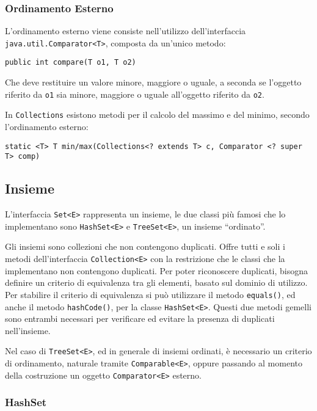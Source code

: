 \documentclass{article}
\numberwithin{equation}{subsection}
\begin{document}
\subsubsection{Ordinamento Esterno}

L'ordinamento esterno viene consiste nell'utilizzo dell'interfaccia \verb|java.util.Comparator<T>|, composta da un'unico metodo:
\begin{verbatim}
public int compare(T o1, T o2)
\end{verbatim}
Che deve restituire un valore minore, maggiore o uguale, a seconda se l'oggetto riferito da \verb|o1| sia minore, maggiore o uguale all'oggetto riferito da \verb|o2|. 

In \verb|Collections| esistono metodi per il calcolo del massimo e del minimo, secondo l'ordinamento esterno:
\begin{verbatim}
static <T> T min/max(Collections<? extends T> c, Comparator <? super T> comp)
\end{verbatim}

\subsection{Insieme}


L'interfaccia \verb|Set<E>| rappresenta un insieme, le due classi più famosi che lo implementano sono \verb|HashSet<E>| e \verb|TreeSet<E>|, un insieme ``ordinato''. 

Gli insiemi sono collezioni che non contengono duplicati. Offre tutti e soli i metodi dell'interfaccia \verb|Collection<E>| con la restrizione che le classi che la 
implementano non contengono duplicati. 
Per poter riconoscere duplicati, bisogna definire un criterio di equivalenza tra gli elementi, basato sul dominio di utilizzo. 
Per stabilire il criterio di equivalenza si può utilizzare il metodo \verb|equals()|, ed anche il metodo \verb|hashCode()|, per la classe \verb|HashSet<E>|. 
Questi due metodi gemelli sono entrambi necessari per verificare ed evitare la presenza di duplicati nell'insieme. 

Nel caso di \verb|TreeSet<E>|, ed in generale di insiemi ordinati, è necessario un criterio di ordinamento, naturale tramite \verb|Comparable<E>|, oppure passando al 
momento della costruzione un oggetto \verb|Comparator<E>| esterno. 

\subsubsection{HashSet}
\end{document}
